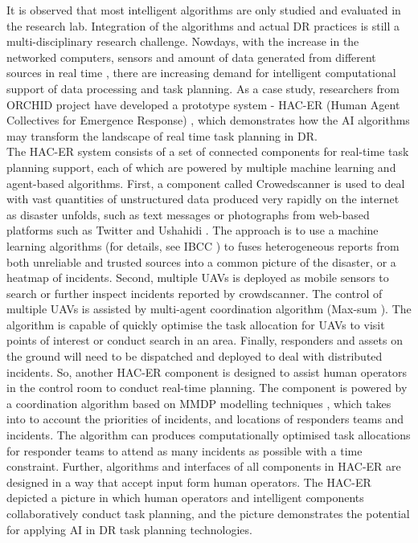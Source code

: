 It is observed that most intelligent algorithms are only studied and evaluated in the research lab. Integration of the algorithms and actual \ac{DR} practices is still a multi-disciplinary research challenge. Nowdays, with the increase in the networked computers, sensors and amount of data generated from different sources in real time \cite{Ramchurn2015}, there are increasing demand for intelligent computational support of data processing and task planning. As a case study, researchers from ORCHID project have developed a prototype system - HAC-ER (Human Agent Collectives for Emergence Response) \cite{Jennings2014,Ramchurn2015,Ramchurn2015a}, which demonstrates how the \ac{AI} algorithms may transform the landscape of real time task planning in \ac{DR}.\\

The \ac{HAC-ER} system consists of a set of connected components for real-time task planning support, each of which are powered by multiple machine learning and agent-based algorithms. First, a component called Crowedscanner is used to deal with vast quantities of unstructured data produced very rapidly on the internet as disaster unfolds, such as text messages or photographs from web-based platforms such as Twitter and Ushahidi \cite{Morrow2011}. The approach is to use a machine learning algorithms (for details, see IBCC \cite{Simpson}) to fuses heterogeneous reports from both unreliable and trusted sources into a common picture of the disaster, or a heatmap of incidents. Second, multiple  \acf{UAV}s is deployed as mobile sensors to search or further inspect incidents reported by crowdscanner. The control of multiple \ac{UAV}s is assisted by multi-agent coordination algorithm (Max-sum \cite{Ramchurn2010}). The algorithm is capable of quickly optimise the task allocation for \ac{UAV}s to visit points of interest or conduct search in an area.  Finally, responders and assets on the ground will need to be dispatched and deployed to deal with distributed incidents. So, another \ac{HAC-ER} component is designed to assist human operators in the control room to conduct real-time planning. The component is powered by a coordination algorithm based on MMDP modelling techniques \cite{Wu2015}, which takes into to account the priorities of incidents, and locations of responders teams and incidents. The algorithm can produces computationally optimised task allocations for responder teams to attend as many incidents as possible with a time constraint. Further, algorithms and interfaces of all components in \ac{HAC-ER} are designed in a way that accept input form human operators. The \ac{HAC-ER} depicted a picture in which human operators and intelligent components collaboratively conduct task planning, and the picture demonstrates the potential for applying \ac{AI} in \ac{DR} task planning technologies.\\

